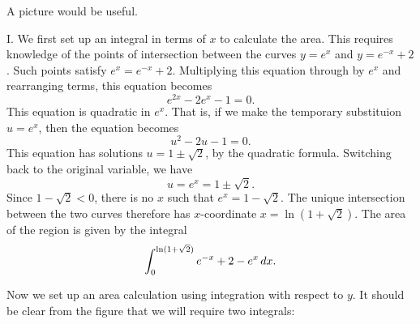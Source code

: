 \documentclass[]{ximera}
\begin{document}
\begin{freeResponse}
A picture would be useful.
\begin{image}
\end{image}

I. We first set up an integral in terms of $x$ to calculate the area. This requires knowledge of the points of intersection between the curves $y=e^x$ and $y=e^{-x} +2$. Such points satisfy $e^x = e^{-x} +2$. Multiplying this equation through by $e^x$ and rearranging terms, this equation becomes
$$
e^{2x} - 2e^x -1 =0.
$$
This equation is quadratic in $e^x$. That is, if we make the temporary substituion $u=e^x$, then the equation becomes
$$
u^2 - 2u - 1 = 0.
$$
This equation has solutions $u = 1 \pm \sqrt{2}$, by the quadratic formula. Switching back to the original variable, we have
$$
u = e^x = 1 \pm \sqrt{2}.
$$
Since $1-\sqrt{2} < 0$, there is no $x$ such that $e^x = 1-\sqrt{2}$. The unique intersection between the two curves therefore has $x$-coordinate $x = \ln(1+ \sqrt{2})$. The area of the region is given by the integral
$$
\int_0^{\ln (1+ \sqrt{2})} e^{-x}+2-e^x \mathop{}\!d x.
$$

Now we set up an area calculation using integration with respect to $y$. It should be clear from the figure that we will require two integrals:


\end{freeResponse}
\end{document}
